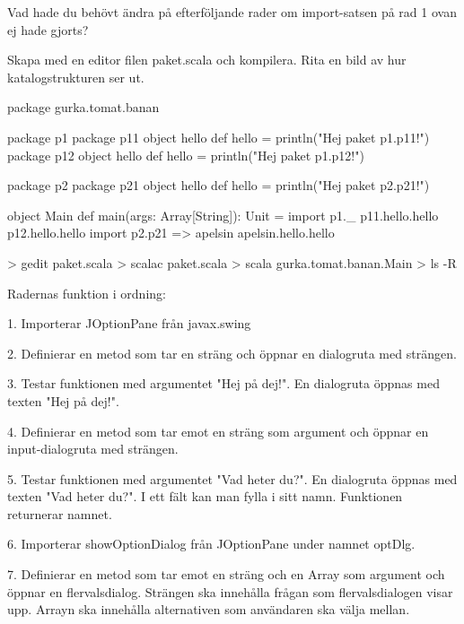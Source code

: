 \Subtask\Pen Vad hade du behövt ändra på efterföljande rader om import-satsen på rad 1 ovan ej hade gjorts?

\Subtask Skapa med en editor filen paket.scala och kompilera. Rita en bild av hur katalogstrukturen ser ut.

\begin{Code}
package gurka.tomat.banan

package p1 {
  package p11 {
    object hello {
      def hello = println("Hej paket p1.p11!")
    }
  }
  package p12 {
    object hello {
      def hello = println("Hej paket p1.p12!")
    }
  }
}

package p2 {
  package p21 {
    object hello {
      def hello = println("Hej paket p2.p21!")
    }
  }
}

object Main {
  def main(args: Array[String]): Unit = {
    import p1._
    p11.hello.hello
    p12.hello.hello
    import p2.{p21 => apelsin}
    apelsin.hello.hello
  }
}
\end{Code}

\begin{REPL}
> gedit paket.scala
> scalac paket.scala
> scala gurka.tomat.banan.Main
> ls -R
\end{REPL}

\SOLUTION


\TaskSolved \what
 

\SubtaskSolved  {}

\SubtaskSolved  Radernas funktion i ordning:

1. Importerar JOptionPane från javax.swing

2. Definierar en metod som tar en sträng och öppnar en dialogruta med strängen.

3. Testar funktionen med argumentet "Hej på dej!". En dialogruta öppnas med texten "Hej på dej!".

4. Definierar en metod som tar emot en sträng som argument och öppnar en input-dialogruta med strängen.

5. Testar funktionen med argumentet "Vad heter du?". En dialogruta öppnas med texten "Vad heter du?". I ett fält kan man fylla i sitt namn. Funktionen returnerar namnet.

6. Importerar showOptionDialog från JOptionPane under namnet optDlg.

7. Definierar en metod som tar emot en sträng och en Array som argument och öppnar en flervalsdialog. Strängen ska innehålla frågan som flervalsdialogen visar upp. Arrayn ska innehålla alternativen som användaren ska välja mellan.

